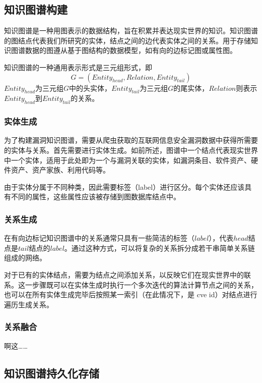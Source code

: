 \documentclass[a4paper,AutoFakeBold,oneside,12pt]{book}
\begin{document}
\subsection{知识图谱构建}

知识图谱是一种用图表示的数据结构，旨在积累并表达现实世界的知识。知识图谱的图结点代表我们所研究的实体，结点之间的边代表实体之间的关系。用于存储知识图谱数据的图遵从基于图结构的数据模型，如有向的边标记图或属性图。\cite{hogan_knowledge_2022}

知识图谱的一种通用表示形式是三元组形式，即
$$G=(Entity_{head}, Relation, Entity_{tail})$$
$Entity_{head}$为三元组$G$中的头实体，$Entity_{tail}$为三元组$G$的尾实体，$Relation$则表示$Entity_{head}$到$Entity_{tail}$的关系。

\subsubsection{实体生成}

为了构建漏洞知识图谱，需要从爬虫获取的互联网信息安全漏洞数据中获得所需要的实体与关系。首先需要进行实体生成。如前所述，图谱中一个结点代表现实世界中一个实体，适用于此处即为一个与漏洞关联的实体，如漏洞条目、软件资产、硬件资产、资产家族、利用代码等。

由于实体分属于不同种类，因此需要标签（label）进行区分。每个实体还应该具有不同的属性，这些属性应该被存储到图数据库结点中。

\subsubsection{关系生成}

在有向边标记知识图谱中的关系通常只具有一些简洁的标签（$label$），代表$head$结点是$tail$结点的$label$。\cite{hogan_knowledge_2022}通过这种方式，可以将复杂的关系拆分成若干串简单关系链组成的网络。

对于已有的实体结点，需要为结点之间添加关系，以反映它们在现实世界中的联系。这一步骤既可以在实体生成时执行一个多次迭代的算法计算节点之间的关系，也可以在所有实体生成完毕后按照某一索引（在此情况下，是 cve id）对结点进行遍历生成关系。

\subsubsection{关系融合}

啊这……

\subsection{知识图谱持久化存储}
\end{document}
